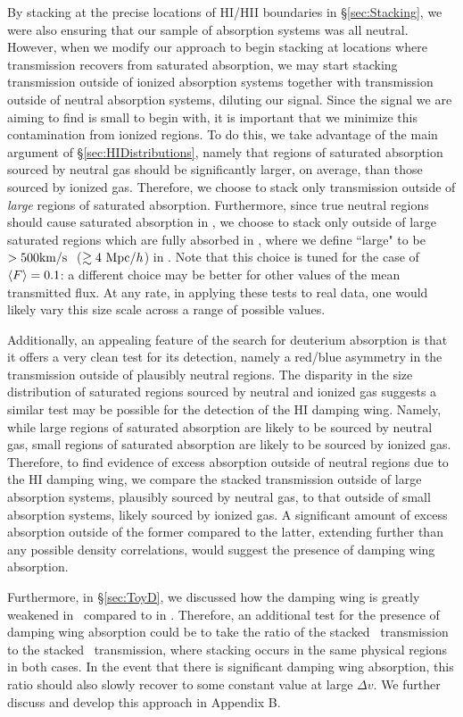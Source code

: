 By stacking at the precise locations of HI/HII boundaries in \S\ref{sec:Stacking}, we were also ensuring that our sample of absorption systems was all neutral. However, when we modify our approach to begin stacking at locations where transmission recovers from saturated absorption, we may start stacking transmission outside of ionized absorption systems together with transmission outside of neutral absorption systems, diluting our signal. Since the signal we are aiming to find is small to begin with, it is important that we minimize this contamination from ionized regions. To do this, we take advantage of the main argument of \S\ref{sec:HIDistributions}, namely that regions of saturated absorption sourced by neutral gas should be significantly larger, on average, than those sourced by ionized gas. Therefore, we choose to stack only transmission outside of \textit{large} regions of saturated absorption. Furthermore, since true neutral regions should cause saturated absorption in \lyb, we choose to stack only outside of large saturated regions which are fully absorbed in \lyb, where we define ``large" to be $>500\text{km}/\text{s}\ $ ($\gtrsim 4\ \text{Mpc/$h$}$) in \lyb. Note that this choice is tuned for
the case of $\langle F \rangle = 0.1$: a different choice may be better for other values of the mean transmitted flux. At any rate, in applying these tests to real data, one would likely vary this size scale across a range
of possible values.


Additionally, an appealing feature of the search for deuterium absorption is that it offers a very clean test for its detection, namely a red/blue asymmetry in the transmission outside of plausibly neutral regions. The disparity in the size distribution of saturated regions sourced by neutral and ionized gas suggests a similar test may be possible for the detection of the HI damping wing. Namely, while large regions of saturated absorption are likely to be sourced by neutral gas, small regions of saturated absorption are likely to be sourced by ionized gas. Therefore, to find evidence of excess absorption outside of neutral regions due to the HI damping wing, we compare the stacked transmission outside of large absorption systems, plausibly sourced by neutral gas, to that outside of small absorption systems, likely sourced by ionized gas. A significant amount of excess absorption outside of the former compared to the latter, extending further than any possible density correlations, would suggest the presence of damping wing absorption.


Furthermore, in \S\ref{sec:ToyD}, we discussed how the damping wing is greatly weakened in \lyb\ compared to in \lya. Therefore, an additional test for the presence of damping wing absorption could be to take the ratio of the stacked \lyb\ transmission to the stacked \lya\ transmission, where stacking occurs in the same physical regions in both cases. In the event that there is significant damping wing absorption, this ratio should also slowly recover to some constant value at large $\Delta v$. We further discuss and develop this approach in Appendix B.


